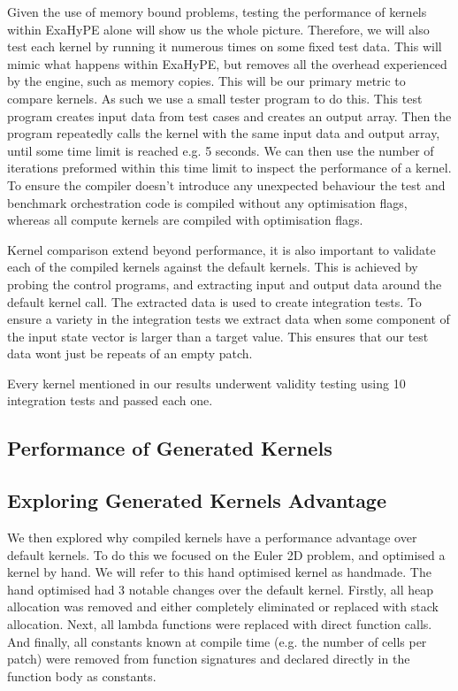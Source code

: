 Given the use of memory bound problems, testing the performance of kernels within ExaHyPE alone will show us the whole picture.
Therefore, we will also test each kernel by running it numerous times on some fixed test data.
This will mimic what happens within ExaHyPE, but removes all the overhead experienced by the engine, such as memory copies.
This will be our primary metric to compare kernels.
As such we use a small tester program to do this.
This test program creates input data from test cases and creates an output array.
Then the program repeatedly calls the kernel with the same input data and output array, until some time limit is reached e.g. 5 seconds.
We can then use the number of iterations preformed within this time limit to inspect the performance of a kernel.
To ensure the compiler doesn't introduce any unexpected behaviour the test and benchmark orchestration code is compiled without any optimisation flags, whereas all compute kernels are compiled with optimisation flags.

Kernel comparison extend beyond performance, it is also important to validate each of the compiled kernels against the default kernels.
This is achieved by probing the control programs, and extracting input and output data around the default kernel call.
The extracted data is used to create integration tests.
To ensure a variety in the integration tests we extract data when some component of the input state vector is larger than a target value. 
This ensures that our test data wont just be repeats of an empty patch.

Every kernel mentioned in our results underwent validity testing using 10 integration tests and passed each one.

\subsection{Performance of Generated Kernels}

\subsection{Exploring Generated Kernels Advantage}

We then explored why compiled kernels have a performance advantage over default kernels.
To do this we focused on the Euler 2D problem, and optimised a kernel by hand.
We will refer to this hand optimised kernel as handmade.
The hand optimised had 3 notable changes over the default kernel.
Firstly, all heap allocation was removed and either completely eliminated or replaced with stack allocation.
Next, all lambda functions were replaced with direct function calls.
And finally, all constants known at compile time (e.g. the number of cells per patch) were removed from function signatures and declared directly in the function body as constants.

